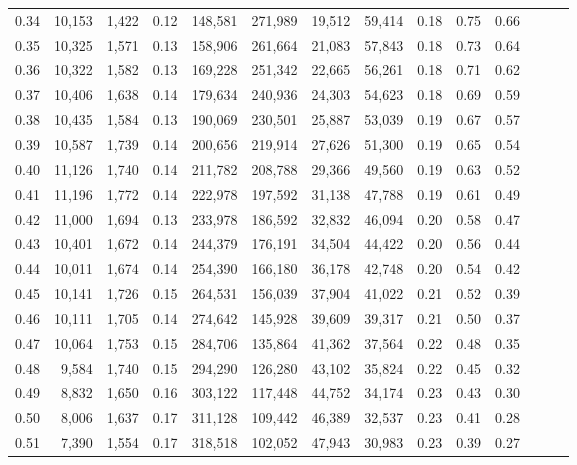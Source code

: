 \begin{tabular}{rrrrrrrrrrrrrr}
0.34 &  10,153 &  1,422 &  0.12 &  148,581 &  271,989 &  19,512 &  59,414 &  0.18 &  0.75 &      0.66 \\
0.35 &  10,325 &  1,571 &  0.13 &  158,906 &  261,664 &  21,083 &  57,843 &  0.18 &  0.73 &      0.64 \\
0.36 &  10,322 &  1,582 &  0.13 &  169,228 &  251,342 &  22,665 &  56,261 &  0.18 &  0.71 &      0.62 \\
0.37 &  10,406 &  1,638 &  0.14 &  179,634 &  240,936 &  24,303 &  54,623 &  0.18 &  0.69 &      0.59 \\
0.38 &  10,435 &  1,584 &  0.13 &  190,069 &  230,501 &  25,887 &  53,039 &  0.19 &  0.67 &      0.57 \\
0.39 &  10,587 &  1,739 &  0.14 &  200,656 &  219,914 &  27,626 &  51,300 &  0.19 &  0.65 &      0.54 \\
0.40 &  11,126 &  1,740 &  0.14 &  211,782 &  208,788 &  29,366 &  49,560 &  0.19 &  0.63 &      0.52 \\
0.41 &  11,196 &  1,772 &  0.14 &  222,978 &  197,592 &  31,138 &  47,788 &  0.19 &  0.61 &      0.49 \\
0.42 &  11,000 &  1,694 &  0.13 &  233,978 &  186,592 &  32,832 &  46,094 &  0.20 &  0.58 &      0.47 \\
0.43 &  10,401 &  1,672 &  0.14 &  244,379 &  176,191 &  34,504 &  44,422 &  0.20 &  0.56 &      0.44 \\
0.44 &  10,011 &  1,674 &  0.14 &  254,390 &  166,180 &  36,178 &  42,748 &  0.20 &  0.54 &      0.42 \\
0.45 &  10,141 &  1,726 &  0.15 &  264,531 &  156,039 &  37,904 &  41,022 &  0.21 &  0.52 &      0.39 \\
0.46 &  10,111 &  1,705 &  0.14 &  274,642 &  145,928 &  39,609 &  39,317 &  0.21 &  0.50 &      0.37 \\
0.47 &  10,064 &  1,753 &  0.15 &  284,706 &  135,864 &  41,362 &  37,564 &  0.22 &  0.48 &      0.35 \\
0.48 &   9,584 &  1,740 &  0.15 &  294,290 &  126,280 &  43,102 &  35,824 &  0.22 &  0.45 &      0.32 \\
0.49 &   8,832 &  1,650 &  0.16 &  303,122 &  117,448 &  44,752 &  34,174 &  0.23 &  0.43 &      0.30 \\
0.50 &   8,006 &  1,637 &  0.17 &  311,128 &  109,442 &  46,389 &  32,537 &  0.23 &  0.41 &      0.28 \\
0.51 &   7,390 &  1,554 &  0.17 &  318,518 &  102,052 &  47,943 &  30,983 &  0.23 &  0.39 &      0.27 \\

\end{tabular}
